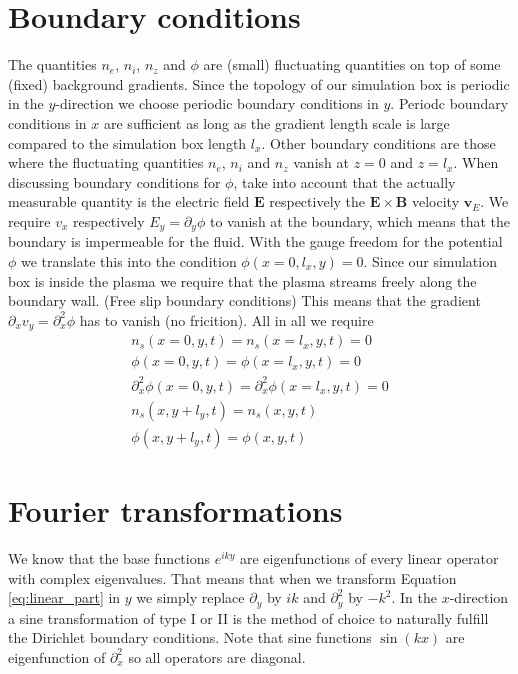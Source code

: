 \documentclass[a4paper,12pt]{scrartcl}
\renewcommand{\vec}[1]{{\mathbf{#1}}}
\begin{document}
\section{ Boundary conditions} 
The quantities $n_e$, $n_i$, $n_z$ and $\phi$ are (small) fluctuating quantities on top of
some (fixed) background gradients. Since the topology of our simulation box is periodic in the $y$-direction 
we choose periodic boundary conditions in $y$. 
Periodc boundary conditions in $x$ are sufficient as long as the gradient length scale is large 
compared to the simulation box length $l_x$.
Other boundary conditions are those where the fluctuating quantities 
$n_e$, $n_i$ and $n_z$ vanish at $z=0$ and $z=l_x$. 
When discussing boundary conditions for $\phi$, take into account that the actually measurable 
quantity is the electric field $\vec E$ respectively the $\vec E \times \vec B$ velocity $\vec v_E$.
We require $v_x $ respectively $E_y = \partial_y\phi$ to vanish at the boundary, which means that the 
boundary is impermeable for the fluid. With the gauge freedom for the potential $\phi$
we translate this into the condition $\phi( x=0,l_x, y) = 0$. Since our simulation box is
inside the plasma we require that the plasma streams freely along the boundary wall.
(Free slip boundary conditions)
This means that the gradient $\partial_x v_y = \partial_x^2 \phi$ has to vanish (no fricition). 
All in all we require
\begin{subequations}
\begin{align}
    n_s( x=0, y,t) = n_s( x=l_x, y,t) = 0 \\
    \phi( x=0, y,t) = \phi( x=l_x, y,t) = 0\\
    \partial_x^2\phi( x=0, y,t) = \partial_x^2\phi( x=l_x, y,t) = 0\\
    n_s( x, y+l_y, t) = n_s( x, y,t) \\
    \phi( x, y+l_y, t) = \phi( x, y,t)
\end{align}
\label{eq:boundary_conditions}
\end{subequations}
\section{Fourier transformations}
\label{sec:Fourier}
We know that the base functions $e^{iky}$ are eigenfunctions of every linear
operator with complex eigenvalues. That means that when we transform Equation \ref{eq:linear_part} in $y$ we simply replace $\partial_y$ by $ik$ and $\partial_y^2$ by $-k^2$. 
In the $x$-direction a sine transformation of type I or II is the method of choice 
to naturally fulfill the Dirichlet boundary conditions. Note that sine functions $\sin(k x)$ are 
eigenfunction of $\partial_x^2$ so all operators are diagonal.


\end{document}
